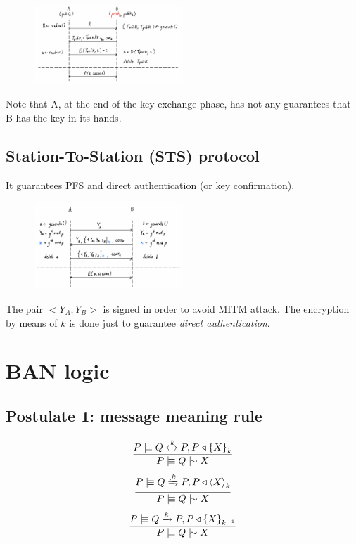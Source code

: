 \documentclass[a4paper,12pt]{article}
\newcommand{\believes}{\mid\!\equiv}
\newcommand{\sees}{\triangleleft}
\newcommand{\oncesaid}{\mid\!\sim}
\newcommand{\combine}[2]{{\langle #1 \rangle}_{#2}}
\newcommand{\encrypt}[2]{{ \{ #1 \} }_{#2}}
\newcommand{\sharekey}[1]{\xleftrightarrow{#1}}
\newcommand{\pubkey}[1]{\xmapsto{#1}}
\newcommand{\secret}[1]{\xleftrightharpoons{#1}}
\begin{document}
\begin{figure}[H]
  \centering
  \includegraphics[width=0.5\textwidth]{img/rsae}
\end{figure}

Note that A, at the end of the key exchange phase, has not any guarantees that B has the key in its hands.

\subsection{Station-To-Station (STS) protocol}
It guarantees PFS and direct authentication (or key confirmation).

\begin{figure}[H]
  \centering
  \includegraphics[width=0.5\textwidth]{img/sts}
\end{figure}

The pair $<Y_A,Y_B>$ is signed in order to avoid MITM attack. The encryption by means of $k$ is done just to guarantee \textit{direct authentication}.

\section{BAN logic}
\subsection{Postulate 1: message meaning rule}

\[\frac{P \believes Q \sharekey{k} P, P \sees \encrypt{X}{k}}{P \believes Q \oncesaid X}\]
\[\frac{P \believes Q \secret{k} P, P \sees \combine{X}{k}}{P \believes Q \oncesaid X}\]
\[\frac{P \believes Q \pubkey{k} P, P \sees \encrypt{X}{k^{-1}}}{P \believes Q \oncesaid X}\]
\end{document}
